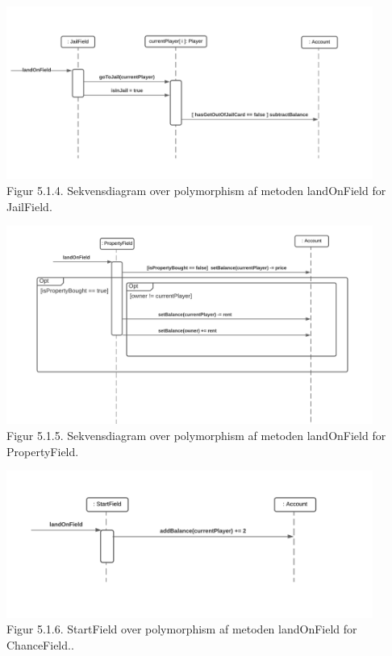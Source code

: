 \begin{flushleft}
\includegraphics[width=0.9\textwidth]{Report/figures/Sekvensdiagram_JailField.png}~\\[1cm]
Figur 5.1.4. Sekvensdiagram over polymorphism af metoden landOnField for JailField.


\includegraphics[width=0.9\textwidth]{Report/figures/Sekvensdiagram_PropertyField.png}~\\[1cm]
Figur 5.1.5. Sekvensdiagram over polymorphism af metoden landOnField for PropertyField.


\includegraphics[width=0.9\textwidth]{Report/figures/Sekvensdiagram_StartField.png}~\\[1cm]
Figur 5.1.6. StartField over polymorphism af metoden landOnField for ChanceField..






\end{flushleft}
